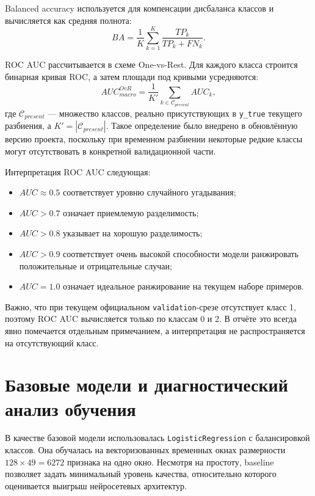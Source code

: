 \documentclass[14pt,a4paper]{extarticle}
\begin{document}
Balanced accuracy используется для компенсации дисбаланса классов и вычисляется как средняя полнота:
\begin{equation}
    BA = \frac{1}{K}\sum_{k=1}^{K} \frac{TP_k}{TP_k + FN_k}.
\end{equation}

ROC AUC рассчитывается в схеме One-vs-Rest. Для каждого класса строится бинарная кривая ROC, а затем площади под кривыми усредняются:
\begin{equation}
    AUC_{macro}^{OvR} = \frac{1}{K'}\sum_{k \in \mathcal{C}_{present}} AUC_k,
\end{equation}
где $\mathcal{C}_{present}$ --- множество классов, реально присутствующих в \texttt{y\_true} текущего разбиения, а $K'=|\mathcal{C}_{present}|$. Такое определение было внедрено в обновлённую версию проекта, поскольку при временном разбиении некоторые редкие классы могут отсутствовать в конкретной валидационной части.

Интерпретация ROC AUC следующая:
\begin{itemize}
    \item $AUC \approx 0.5$ соответствует уровню случайного угадывания;
    \item $AUC > 0.7$ означает приемлемую разделимость;
    \item $AUC > 0.8$ указывает на хорошую разделимость;
    \item $AUC > 0.9$ соответствует очень высокой способности модели ранжировать положительные и отрицательные случаи;
    \item $AUC = 1.0$ означает идеальное ранжирование на текущем наборе примеров.
\end{itemize}

Важно, что при текущем официальном \texttt{validation}-срезе отсутствует класс 1, поэтому ROC AUC вычисляется только по классам 0 и 2. В отчёте это всегда явно помечается отдельным примечанием, а интерпретация не распространяется на отсутствующий класс.

\section{Базовые модели и диагностический анализ обучения}\label{sec:baseline}
В качестве базовой модели использовалась \texttt{LogisticRegression} с балансировкой классов. Она обучалась на векторизованных временных окнах размерности $128\times49=6272$ признака на одно окно. Несмотря на простоту, baseline позволяет задать минимальный уровень качества, относительно которого оценивается выигрыш нейросетевых архитектур.
\end{document}

